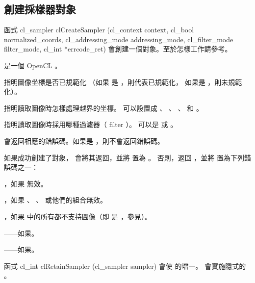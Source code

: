 \subsection{創建採樣器對象}

函式
\startCLFUNC
cl_sampler clCreateSampler (cl_context context,
			cl_bool normalized_coords,
			cl_addressing_mode addressing_mode,
			cl_filter_mode filter_mode,
			cl_int *errcode_ret)
\stopCLFUNC
會創建一個對象。至於怎樣工作請參考。

 是一個 OpenCL 。

 指明圖像坐標是否已規範化
（如果  是 ，則代表已規範化，
如果是 ，則未規範化）。

 指明讀取圖像時怎樣處理越界的坐標。
可以設置成 、 、
 、  和 。

 指明讀取圖像時採用哪種過濾器（ filter ）。
可以是  或 。

 會返回相應的錯誤碼。如果是 ，則不會返回錯誤碼。

如果成功創建了對象，  會將其返回，並將  置為 。
否則，返回 ，並將  置為下列錯誤碼之一：
\startigBase
\item {}，如果  無效。

\item {}，如果 、 、  或他們的組合無效。

\item {}，如果  中的所有都不支持圖像（即  是 ，參見）。

\item {}——如果\scdevfailres。

\item {}——如果\schostfailres。
\stopigBase

函式
\startCLFUNC
cl_int clRetainSampler (cl_sampler sampler)
\stopCLFUNC
會使  的增一。
 會實施隱式的 。

